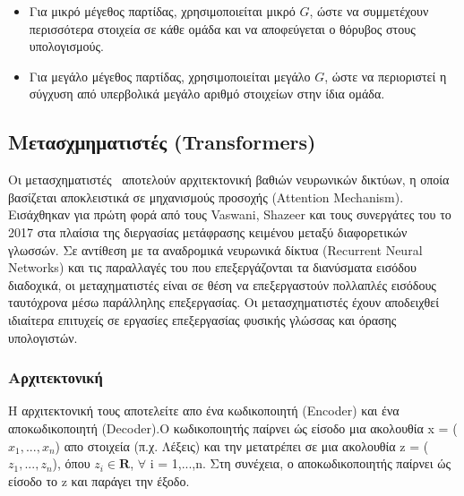 \documentclass[12pt]{article}
\numberwithin{equation}{section}
\begin{document}
\begin{itemize}
  \item Για μικρό μέγεθος παρτίδας, χρησιμοποιείται μικρό \( G \), ώστε να συμμετέχουν περισσότερα στοιχεία σε κάθε ομάδα και να αποφεύγεται ο θόρυβος στους υπολογισμούς.
  \item Για μεγάλο μέγεθος παρτίδας, χρησιμοποιείται μεγάλο \( G \), ώστε να περιοριστεί η σύγχυση από υπερβολικά μεγάλο αριθμό στοιχείων στην ίδια ομάδα.
\end{itemize}

\subsection{Μετασχμηματιστές (Transformers)}

Οι μετασχηματιστές~\cite{vaswani2023attentionneed} αποτελούν αρχιτεκτονική βαθιών νευρωνικών δικτύων, η οποία βασίζεται αποκλειστικά σε μηχανισμούς προσοχής (Attention Mechanism). Εισάχθηκαν για πρώτη φορά από τους Vaswani, Shazeer και τους συνεργάτες του το 2017 στα πλαίσια της διεργασίας μετάφρασης κειμένου μεταξύ διαφορετικών γλωσσών. Σε αντίθεση με τα αναδρομικά νευρωνικά δίκτυα (Recurrent Neural Networks) και τις παραλλαγές του που επεξεργάζονται τα διανύσματα εισόδου διαδοχικά, οι μεταχηματιστές είναι σε θέση να επεξεργαστούν πολλαπλές εισόδους ταυτόχρονα μέσω παράλληλης επεξεργασίας. Οι μετασχηματιστές έχουν αποδειχθεί ιδιαίτερα επιτυχείς σε εργασίες επεξεργασίας φυσικής γλώσσας και όρασης υπολογιστών. \\

\subsubsection{Αρχιτεκτονική}

Η αρχιτεκτονική τους αποτελείτε απο ένα κωδικοποιητή (Encoder) και ένα αποκωδικοποιητή (Decoder).Ο κωδικοποιητής παίρνει ώς είσοδο μια ακολουθία x = (\(x_1,...,x_n\)) απο στοιχεία (π.χ. Λέξεις) και την μετατρέπει σε μια ακολουθία z = (\(z_1,...,z_n\)), όπου \(z_i \in \mathbf{R}\), \(\forall\) i = 1,...,n. Στη συνέχεια, ο αποκωδικοποιητής παίρνει ώς είσοδο το z και παράγει την έξοδο. \\
\end{document}
